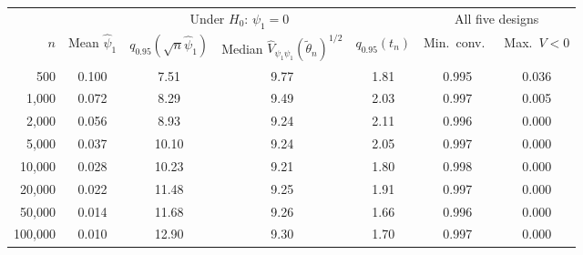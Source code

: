\begin{tabular}{rcccccc}
\toprule
& \multicolumn{4}{c}{Under $H_0$: $\psi_1 = 0$} & \multicolumn{2}{c}{All five designs} \\
\cmidrule(lr){2-5}\cmidrule(lr){6-7}
$n$ & Mean $\hat\psi_1$ & $q_{0.95}(\sqrt{n}\hat\psi_1)$ & Median $\hat{V}_{\psi_1\psi_1}(\tilde\theta_n)^{1/2}$ & $q_{0.95}(t_n)$ & Min.\ conv.\ & Max.\ $V<0$ \\
\midrule
500 & 0.100 & 7.51 & 9.77 & 1.81 & 0.995 & 0.036 \\
1{,}000 & 0.072 & 8.29 & 9.49 & 2.03 & 0.997 & 0.005 \\
2{,}000 & 0.056 & 8.93 & 9.24 & 2.11 & 0.996 & 0.000 \\
5{,}000 & 0.037 & 10.10 & 9.24 & 2.05 & 0.997 & 0.000 \\
10{,}000 & 0.028 & 10.23 & 9.21 & 1.80 & 0.998 & 0.000 \\
20{,}000 & 0.022 & 11.48 & 9.25 & 1.91 & 0.997 & 0.000 \\
50{,}000 & 0.014 & 11.68 & 9.26 & 1.66 & 0.996 & 0.000 \\
100{,}000 & 0.010 & 12.90 & 9.30 & 1.70 & 0.997 & 0.000 \\
\bottomrule
\end{tabular}
